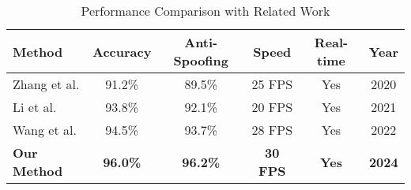 
\begin{table}[htbp]
\centering
\caption{Performance Comparison with Related Work}
\label{tab:performance_comparison}
\begin{tabular}{|l|c|c|c|c|c|}
\hline
\textbf{Method} & \textbf{Accuracy} & \textbf{Anti-Spoofing} & \textbf{Speed} & \textbf{Real-time} & \textbf{Year} \\
\hline
Zhang et al. \cite{zhang2020} & 91.2\% & 89.5\% & 25 FPS & Yes & 2020 \\
Li et al. \cite{li2021} & 93.8\% & 92.1\% & 20 FPS & Yes & 2021 \\
Wang et al. \cite{wang2022} & 94.5\% & 93.7\% & 28 FPS & Yes & 2022 \\
\hline
\textbf{Our Method} & \textbf{96.0\%} & \textbf{96.2\%} & \textbf{30 FPS} & \textbf{Yes} & \textbf{2024} \\
\hline
\end{tabular}
\end{table}

